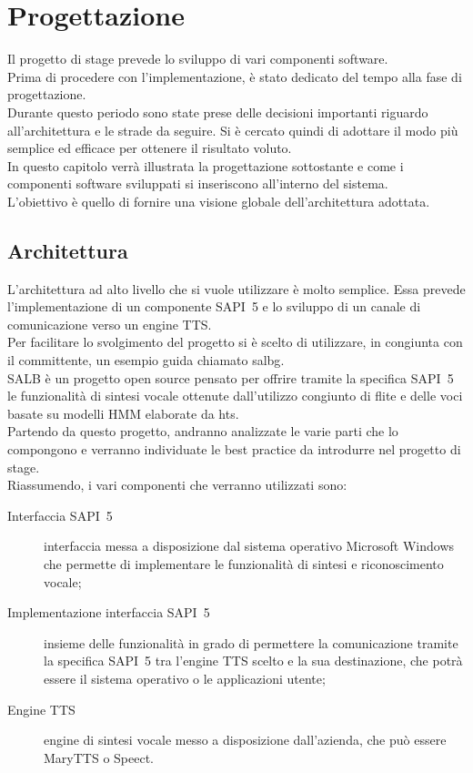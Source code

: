 \chapter{Progettazione} %
Il progetto di stage prevede lo sviluppo di vari componenti software.\\
Prima di procedere con l'implementazione, è stato dedicato del tempo alla fase di progettazione.\\
Durante questo periodo sono state prese delle decisioni importanti riguardo all'architettura e le strade da seguire. Si è cercato quindi di adottare il modo più semplice ed efficace per ottenere il risultato voluto.\\
In questo capitolo verrà illustrata la progettazione sottostante e come i componenti software sviluppati si inseriscono all'interno del sistema.\\
L'obiettivo è quello di fornire una visione globale dell'architettura adottata.
  
\thispagestyle{empty}

\newpage
\section{Architettura}
L'architettura ad alto livello che si vuole utilizzare è molto semplice. Essa prevede l'implementazione di un componente SAPI~5 e lo sviluppo di un canale di comunicazione verso un engine TTS.\\
Per facilitare lo svolgimento del progetto si è scelto di utilizzare, in congiunta con il committente, un esempio guida chiamato \gls{salbg}.\\
SALB è un progetto open source pensato per offrire tramite la specifica SAPI~5 le funzionalità di sintesi vocale ottenute dall'utilizzo congiunto di flite e delle voci basate su modelli HMM elaborate da \gls{hts}.\\
Partendo da questo progetto, andranno analizzate le varie parti che lo compongono e verranno individuate le best practice da introdurre nel progetto di stage.\\
Riassumendo, i vari componenti che verranno utilizzati sono:
\begin{description}
	\item[Interfaccia SAPI~5] interfaccia messa a disposizione dal sistema operativo Microsoft Windows che permette di implementare le funzionalità di sintesi e riconoscimento vocale;
	\item[Implementazione interfaccia SAPI~5] insieme delle funzionalità in grado di permettere la comunicazione tramite la specifica SAPI~5 tra l'engine TTS scelto e la sua destinazione, che potrà essere il sistema operativo o le applicazioni utente; 
	\item[Engine TTS] engine di sintesi vocale messo a disposizione dall'azienda, che può essere MaryTTS o Speect.
\end{description}

